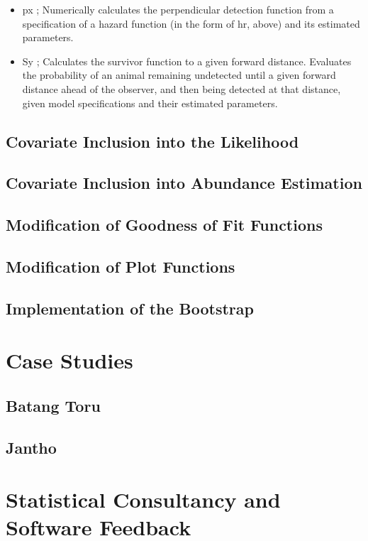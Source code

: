 \documentclass[11pt]{article}
\begin{document}
\begin{multicols}{2}
\begin{itemize}
\item px ; Numerically calculates the perpendicular detection function from a specification of a hazard function (in the form of hr, above) and its estimated parameters.

\item Sy ; Calculates the survivor function to a given forward distance. Evaluates the probability of an animal remaining undetected until a given forward distance ahead of the observer, and then being detected at that distance, given model specifications and their estimated parameters.
\end{itemize}

\subsection{Covariate Inclusion into the Likelihood}
\subsection{Covariate Inclusion into Abundance Estimation}
\subsection{Modification of Goodness of Fit Functions}
\subsection{Modification of Plot Functions}
\subsection{Implementation of the Bootstrap}

\section{Case Studies}
\subsection{Batang Toru}
\subsection{Jantho}

\section{Statistical Consultancy and Software Feedback}

\end{multicols}
\end{document}
